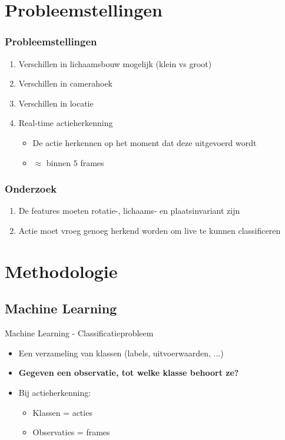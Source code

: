 \documentclass[]{beamer}
\begin{document}
	\section{Probleemstellingen}
	\begin{frame}\frametitle{Probleemstellingen}
		\begin{enumerate}
			\item Verschillen in lichaamsbouw mogelijk (klein vs groot)
			\item Verschillen in camerahoek
			\item Verschillen in locatie
			\item<2-> Real-time actieherkenning
			\begin{itemize}
				\item De actie herkennen op het moment dat deze uitgevoerd wordt
				\item $\approx$ binnen $5$ frames
			\end{itemize} 
		\end{enumerate}
	\end{frame}

	\begin{frame}\frametitle{Onderzoek}
		\begin{enumerate}
			\item De features moeten rotatie-, lichaams- en plaatsinvariant zijn
			\item Actie moet vroeg genoeg herkend worden om live te kunnen classificeren
		\end{enumerate}
	\end{frame}


	\section{Methodologie}
	\subsection{Machine Learning}
	\begin{frame}{Machine Learning - Classificatieprobleem}
			\begin{itemize}
				\item Een verzameling van klassen (labels, uitvoerwaarden, ...)
				\item \textbf{Gegeven een observatie, tot welke klasse behoort ze?}
				\item Bij actieherkenning:
				\begin{itemize}
					\item Klassen = acties
					\item Observaties = frames
				\end{itemize}
			\end{itemize}

	\end{frame}
	
\end{document}
